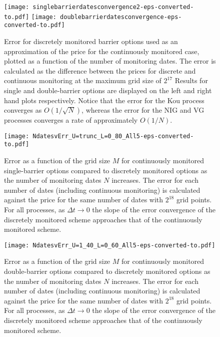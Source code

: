 \documentclass[11pt,a4paper]{article}
\begin{document}
\begin{figure}
\begin{center}
\texttt{[image: singlebarrierdatesconvergence2-eps-converted-to.pdf]}
\texttt{[image: doublebarrierdatesconvergence-eps-converted-to.pdf]}
\caption{Error for discretely monitored barrier options used as an approximation of the price for the continuously monitored case, plotted as a function of the number of monitoring dates. The error is calculated as the difference between the prices for discrete and continuous monitoring at the maximum grid size of $2^{17}$ Results for single and double-barrier options are displayed on the left and right hand plots respectively. Notice that the error for the Kou process converges as $O(1/\sqrt{N})$, whereas the error for the NIG and VG processes converges a rate of approximately $O(1/N)$.}
\label{fig:barrierdatesconvergence}
\end{center}
\end{figure}

\begin{figure}
\begin{center}
\texttt{[image: NdatesvErr\_U=trunc\_L=0\_80\_All5-eps-converted-to.pdf]}
\caption{Error as a function of the grid size $M$ for continuously monitored single-barrier options compared to discretely monitored options as the number of monitoring dates $N$ increases. The error for each number of dates (including continuous monitoring) is calculated against the price for the same number of dates with $2^{18}$ grid points. For all processes, as $\Delta t\rightarrow 0$ the slope of the error convergence of the discretely monitored scheme approaches that of the continuously monitored scheme.}
\label{fig:NdatesvErr_U=trunc_L=0_80_All}
\end{center}
\end{figure}

\begin{figure}
\begin{center}
\texttt{[image: NdatesvErr\_U=1\_40\_L=0\_60\_All5-eps-converted-to.pdf]}
\caption{Error as a function of the grid size $M$ for continuously monitored double-barrier options compared to discretely monitored options as the number of monitoring dates $N$ increases. The error for each number of dates (including continuous monitoring) is calculated against the price for the same number of dates with $2^{18}$ grid points. For all processes, as $\Delta t\rightarrow 0$ the slope of the error convergence of the discretely monitored scheme approaches that of the continuously monitored scheme.}
\label{fig:NdatesvErr_U=1_40_L=0_60_All}
\end{center}
\end{figure}
\end{document}
